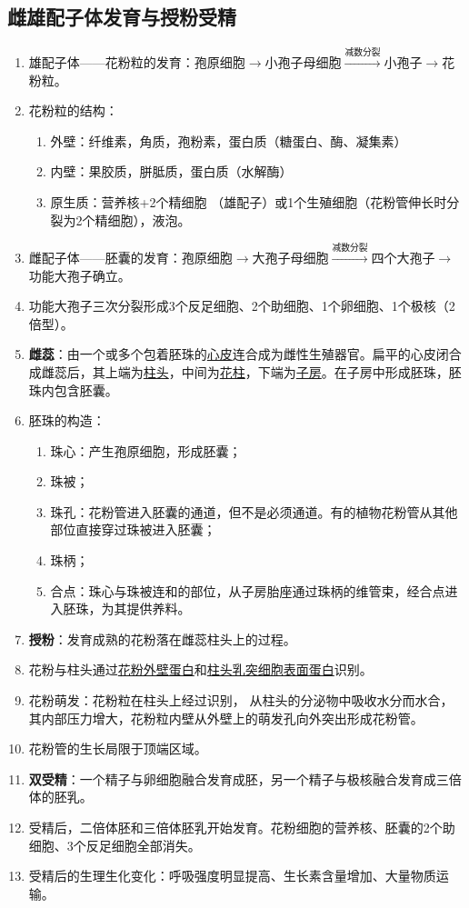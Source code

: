 \subsection{雌雄配子体发育与授粉受精}
\begin{enumerate}
    \item 雄配子体——花粉粒的发育：孢原细胞$\to$小孢子母细胞$\overset{\text{减数分裂}}\longrightarrow$小孢子$\to$花粉粒。
    \item 花粉粒的结构：
    \begin{enumerate}
        \item 外壁：纤维素，角质，孢粉素，蛋白质（糖蛋白、酶、凝集素）
        \item 内壁：果胶质，胼胝质，蛋白质（水解酶）
        \item 原生质：营养核+2个精细胞 （雄配子）或1个生殖细胞（花粉管伸长时分裂为2个精细胞），液泡。
    \end{enumerate}
    \item 雌配子体——胚囊的发育：孢原细胞$\to$大孢子母细胞$\overset{\text{减数分裂}}\longrightarrow$四个大孢子$\to$功能大孢子确立。
    \item 功能大孢子三次分裂形成3个反足细胞、2个助细胞、1个卵细胞、1个极核（2倍型）。
    \item \textbf{雌蕊}：由一个或多个包着胚珠的\uline{心皮}连合成为雌性生殖器官。扁平的心皮闭合成雌蕊后，其上端为\uline{柱头}，中间为\uline{花柱}，下端为\uline{子房}。在子房中形成胚珠，胚珠内包含胚囊。
    \item 胚珠的构造：
    \begin{enumerate}
        \item 珠心：产生孢原细胞，形成胚囊；
        \item 珠被；
        \item 珠孔：花粉管进入胚囊的通道，但不是必须通道。有的植物花粉管从其他部位直接穿过珠被进入胚囊；
        \item 珠柄；
        \item 合点：珠心与珠被连和的部位，从子房胎座通过珠柄的维管束，经合点进入胚珠，为其提供养料。
    \end{enumerate}
    \item \textbf{授粉}：发育成熟的花粉落在雌蕊柱头上的过程。
    \item 花粉与柱头通过\uline{花粉外壁蛋白}和\uline{柱头乳突细胞表面蛋白}识别。
    \item 花粉萌发：花粉粒在柱头上经过识别， 从柱头的分泌物中吸收水分而水合，其内部压力增大，花粉粒内壁从外壁上的萌发孔向外突出形成花粉管。
    \item 花粉管的生长局限于顶端区域。
    \item \textbf{双受精}：一个精子与卵细胞融合发育成胚，另一个精子与极核融合发育成三倍体的胚乳。
    \item 受精后，二倍体胚和三倍体胚乳开始发育。花粉细胞的营养核、胚囊的2个助细胞、3个反足细胞全部消失。
    \item 受精后的生理生化变化：呼吸强度明显提高、生长素含量增加、大量物质运输。
\end{enumerate}
